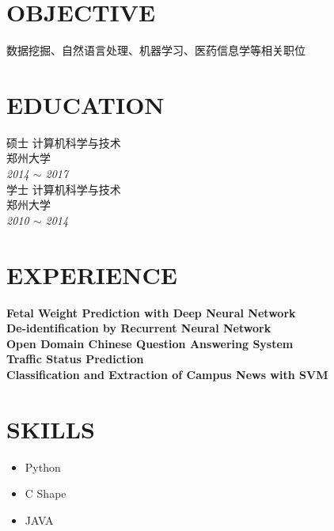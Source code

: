\documentclass[line, margin]{res}
\begin{document}
\address{likun@stu.zzu.edu.cn}
\address{152-251-11797}

\begin{resume}
\section{OBJECTIVE}
{ 数据挖掘、自然语言处理、机器学习、医药信息学等相关职位}

\section{EDUCATION} 
 { 硕士 计算机科学与技术  \\
 郑州大学 }\\
 {\sl 2014 $\sim$ 2017} \\
[15pt]
 { 学士 计算机科学与技术 \\
 郑州大学 } \\
 {\sl 2010 $\sim$ 2014 }
 
\section{EXPERIENCE}

 {\bf Fetal Weight Prediction with Deep Neural Network} \\
 {\bf De-identification by Recurrent Neural Network} \\
 {\bf Open Domain Chinese Question Answering System} \\
 {\bf Traffic Status Prediction} \\
 {\bf Classification and Extraction of Campus News with SVM} \\
 
\section{SKILLS}
\begin{itemize}
\item Python
\item C Shape
\item JAVA
\end{itemize}

\end{resume}
\end{document}
